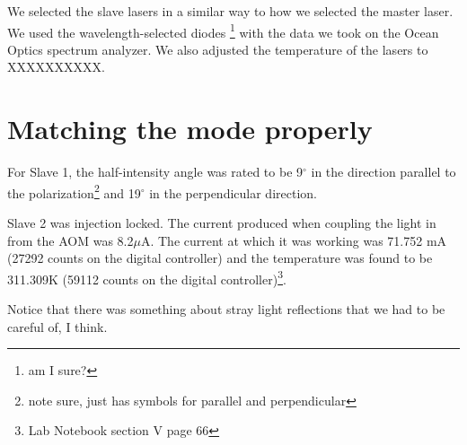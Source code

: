 We selected the slave lasers in a similar way to how we selected the master laser. We used the wavelength-selected diodes \footnote{am I sure?} with the data we took on the Ocean Optics spectrum analyzer. We also adjusted the temperature of the lasers to XXXXXXXXXX.

\section{Matching the mode properly}

For Slave 1, the half-intensity angle was rated to be 9$^\circ$ in the direction parallel to the polarization\footnote{note sure, just has symbols for parallel and perpendicular} and 19$^\circ$ in the perpendicular direction. 

Slave 2 was injection locked. The current produced when coupling the light in from the AOM was 8.2$\mu$A. The current at which it was working was 71.752 mA (27292 counts on the digital controller) and the temperature was found to be 311.309K (59112 counts on the digital controller)\footnote{Lab Notebook section V page 66}. 

Notice that there was something about stray light reflections that we had to be careful of, I think. 
